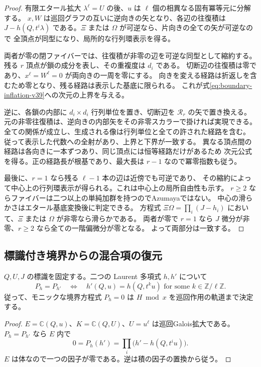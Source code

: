 \begin{proof}
有限エタール拡大 $\lambda^\ell=U$ の後、$u$ は $\ell$ 個の相異なる固有冪等元に分解する。
$x,W$ は巡回グラフの互いに逆向きの矢となり、各辺の往復積は
$J-h(Q,t^i\lambda)$ である。$\Xi$ または $\Omega$ が可逆なら、片向きの全ての矢が可逆なので
全頂点が同型になり、局所的な行列環表示を得る。

両者が零の閉ファイバーでは、往復積が非零の辺を可逆な同型として縮約する。
残る $r$ 頂点が鎖の成分を表し、その重複度は $d_i$ である。
切断辺の往復積は零であり、$x^\ell=W^\ell=0$ が両向きの一周を零にする。
向きを変える経路は折返しを含むため零となり、残る経路は表示した基底に限られる。
これが式\eqref{eq:boundary-inflation-v39}への次元の上界を与える。

逆に、各鎖の内部に $d_i\times d_i$ 行列単位を置き、切断辺を $\mathcal R_r$ の矢で置き換える。
元の非零往復積は、逆向きの内部矢をその非零スカラーで掛ければ実現できる。
全ての関係が成立し、生成される像は行列単位と全ての許された経路を含む。
従って表示した代数への全射があり、上界と下界が一致する。
異なる頂点間の経路は各向きに一本ずつあり、同じ頂点には恒等経路だけがあるため
次元公式を得る。正の経路長が根基であり、最大長は $r-1$ なので冪零指数も従う。

最後に、$r=1$ なら残る $\ell-1$ 本の辺は近傍でも可逆であり、
その縮約によって中心上の行列環表示が得られる。これは中心上の局所自由性も示す。
$r\ge2$ ならファイバーは二つ以上の単純加群を持つのでAzumayaではない。
中心の滑らかさはエタール基底変換後に判定できる。
方程式 $\Xi\Omega=\prod_i(J-h_i)$ において、$\Xi$ または $\Omega$ が非零なら滑らかである。
両者が零で $r=1$ なら $J$ 微分が非零、$r\ge2$ なら全ての一階偏微分が零となる。
よって両部分は一致する。
\end{proof}

\subsection{標識付き境界からの混合項の復元}

\begin{proposition}[巡回ノルムの復元性]
\label{prop:boundary-recovery-v39}
$Q,U,J$ の標識を固定する。二つの Laurent 多項式 $h,h'$ について
\[
 P_h=P_{h'}\quad\Longleftrightarrow\quad
 h'(Q,u)=h(Q,t^ku)\text{ for some }k\in\mathbb Z/\ell\mathbb Z.
\]
従って、モニックな境界方程式 $P_h=0$ は $H\bmod x$ を巡回作用の軌道まで決定する。
\end{proposition}

\begin{proof}
$E=\mathbb C(Q,u)$、$K=\mathbb C(Q,U)$、$U=u^\ell$ は巡回Galois拡大である。
$P_h=P_{h'}$ なら $E$ 内で
\[
 0=P_h(h')=\prod_i\bigl(h'-h(Q,t^iu)\bigr).
\]
$E$ は体なので一つの因子が零である。逆は積の因子の置換から従う。
\end{proof}

